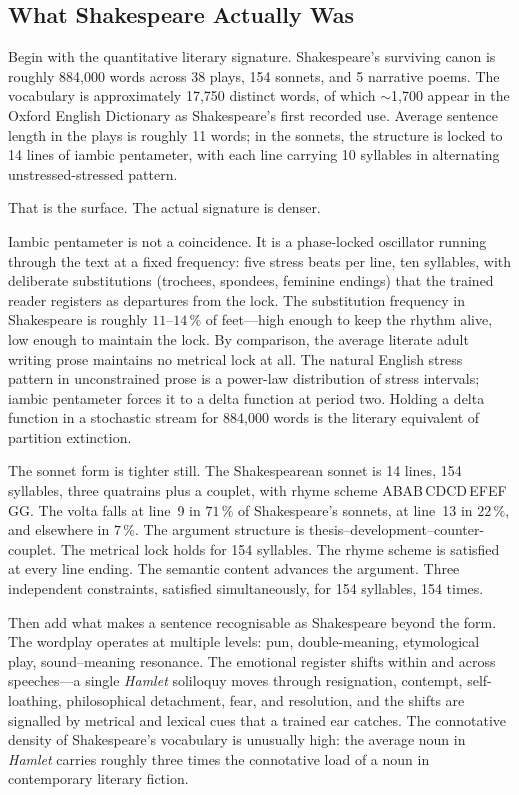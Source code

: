 \documentclass[11pt,twocolumn,a4paper]{article}
\theoremstyle{definition}
\theoremstyle{remark}
\begin{document}
\subsection{What Shakespeare Actually Was}

Begin with the quantitative literary signature.  Shakespeare's surviving canon
is roughly 884{,}000 words across 38 plays, 154 sonnets, and 5 narrative
poems.  The vocabulary is approximately 17{,}750 distinct words, of which
$\sim$1{,}700 appear in the Oxford English Dictionary as Shakespeare's first
recorded use.  Average sentence length in the plays is roughly 11 words; in
the sonnets, the structure is locked to 14 lines of iambic pentameter, with
each line carrying 10 syllables in alternating unstressed-stressed pattern.

That is the surface.  The actual signature is denser.

Iambic pentameter is not a coincidence.  It is a phase-locked oscillator
running through the text at a fixed frequency: five stress beats per line, ten
syllables, with deliberate substitutions (trochees, spondees, feminine endings)
that the trained reader registers as departures from the lock.  The
substitution frequency in Shakespeare is roughly $11$--$14\,\%$ of feet---high
enough to keep the rhythm alive, low enough to maintain the lock.  By
comparison, the average literate adult writing prose maintains no metrical lock
at all.  The natural English stress pattern in unconstrained prose is a
power-law distribution of stress intervals; iambic pentameter forces it to a
delta function at period two.  Holding a delta function in a stochastic stream
for 884{,}000 words is the literary equivalent of partition extinction.

The sonnet form is tighter still.  The Shakespearean sonnet is 14 lines,
154 syllables, three quatrains plus a couplet, with rhyme scheme
ABAB\,CDCD\,EFEF\,GG.  The volta falls at line~9 in $71\,\%$ of
Shakespeare's sonnets, at line~13 in $22\,\%$, and elsewhere in $7\,\%$.  The
argument structure is thesis--development--counter-couplet.  The metrical lock
holds for 154 syllables.  The rhyme scheme is satisfied at every line ending.
The semantic content advances the argument.  Three independent constraints,
satisfied simultaneously, for 154 syllables, 154 times.

Then add what makes a sentence recognisable as Shakespeare beyond the form.
The wordplay operates at multiple levels: pun, double-meaning, etymological
play, sound--meaning resonance.  The emotional register shifts within and
across speeches---a single \textit{Hamlet} soliloquy moves through
resignation, contempt, self-loathing, philosophical detachment, fear, and
resolution, and the shifts are signalled by metrical and lexical cues that a
trained ear catches.  The connotative density of Shakespeare's vocabulary is
unusually high: the average noun in \textit{Hamlet} carries roughly three times
the connotative load of a noun in contemporary literary fiction.
\end{document}
